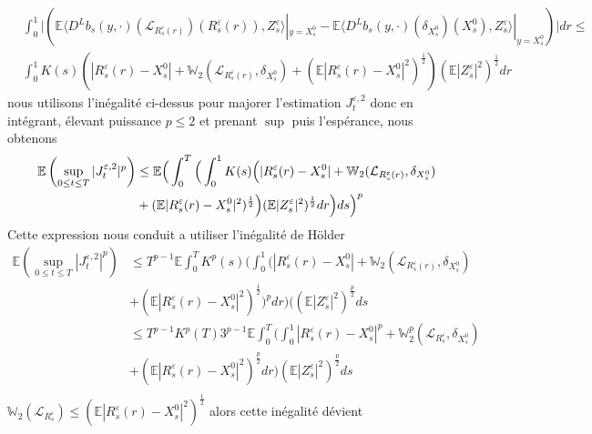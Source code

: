 \documentclass[12pt,a4paper,twoside,fleqn]{book}%
\theoremstyle{definition}
\theoremstyle{lemme}
\numberwithin{equation}{section}
\begin{document}
\[
\begin{aligned}
	&\int_{0}^{1}\Big|\left(\mathbb{E}\langle D^Lb_s(y,\cdot)(\mathcal{L}_{R_s^\varepsilon(r)})(R_s^\varepsilon(r)),Z_s^\varepsilon\rangle|_{y=X_s^0}  - \mathbb{E}\langle D^L b_s(y, \cdot)(\delta_{X_s^0})(X_s^0), Z_s^\varepsilon\rangle|_{y=X_s^0}\right)\Big|dr\leq\\
	&\int_{0}^{1}K(s)\left(|R_s^\varepsilon(r)-X_s^0| + \mathbb{W}_2(\mathcal{L}_{R_s^\varepsilon(r)},\delta_{X_s^0})+ (\mathbb{E}|R_s^\varepsilon(r)-X_s^0|^2)^{\frac{1}{2}}\right)(\mathbb{E}|Z_s^\varepsilon|^2)^{\frac{1}{2}}dr
\end{aligned}
\]
nous utilisons l'inégalité ci-dessus pour majorer l'estimation $J_t^{\varepsilon,2}$ donc en intégrant, élevant puissance $p\leq2$ et prenant $\sup$ puis l'espérance, nous obtenons
\[\begin{aligned}
\mathbb{E}\left(\sup_{0\leq t \leq T}|J_t^{\varepsilon,2}|^p\right)	&\leq\mathbb{E}\Big(\int_{0}^{T}\Big(\int_{0}^{1}K(s)\Big(|R_s^\varepsilon(r)-X_s^0| + \mathbb{W}_2(\mathcal{L}_{R_s^\varepsilon(r)},\delta_{X_s^0})\\
&+(\mathbb{E}|R_s^\varepsilon(r)-X_s^0|^2)^{\frac{1}{2}}\Big)(\mathbb{E}|Z_s^\varepsilon|^2)^{\frac{1}{2}}dr\Big) ds\Big)^p
\end{aligned}\\
\]
Cette expression nous conduit a utiliser l'inégalité de Hölder
\[
\begin{aligned}
	\mathbb{E}\left(\sup_{0\leq t \leq T}|J_t^{\varepsilon,2}|^p\right)&\leq T^{p-1}\mathbb{E}\int_{0}^{T}K^p(s)\Big(\int_{0}^{1}\Big(|R_s^\varepsilon(r)-X_s^0| + \mathbb{W}_2(\mathcal{L}_{R_s^\varepsilon(r)},\delta_{X_s^0})\\
	&+(\mathbb{E}|R_s^\varepsilon(r)-X_s^0|^2)^{\frac{1}{2}}\Big)^pdr\Big)((\mathbb{E}|Z_s^\varepsilon|^2)^{\frac{p}{2}} ds\\
	&\leq T^{p-1}K^p(T)3^{p-1}\mathbb{E}\int_{0}^{T}\Big(\int_{0}^{1}|R_s^\varepsilon(r)-X_s^0|^p+\mathbb{W}_2^p(\mathcal{L}_{R_s^\varepsilon},\delta_{X_s^0})\\
	&+\left(\mathbb{E}|R_s^\varepsilon(r)-X_s^0|^2\right)^{\frac{p}{2}}dr\Big)(\mathbb{E}|Z_s^\varepsilon|^2)^{\frac{p}{2}}ds\\
\end{aligned}
\]
$\mathbb{W}_2(\mathcal{L}_{R_s^\varepsilon})\leq(\mathbb{E}|R_s^\varepsilon(r)-X_s^0|^2)^{\frac{1}{2}}$ alors cette inégalité dévient
\end{document}
